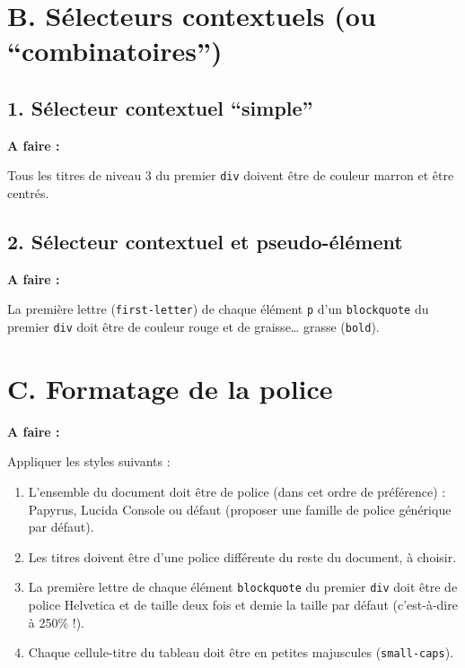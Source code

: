 \documentclass[a4paper,11pt]{article}
\begin{document}
\section{B. Sélecteurs contextuels (ou ``combinatoires'')}

\subsection{1. Sélecteur contextuel ``simple''}

\begin{afaire}
\textbf{A faire :}

Tous les titres de niveau 3 du premier \textcolor{rose}{\texttt{div}} doivent être de couleur marron et être centrés.
\end{afaire}

\subsection{2. Sélecteur contextuel et pseudo-élément}

\begin{afaire}
\textbf{A faire :}

La première lettre (\textcolor{rose}{\texttt{first-letter}}) de chaque élément \texttt{p} d'un \textcolor{rose}{\texttt{blockquote}} du premier \textcolor{rose}{\texttt{div}} doit être de couleur rouge et de graisse\ldots{} grasse (\textcolor{rose}{\texttt{bold}}).
\end{afaire}

\section{C. Formatage de la police}

\begin{afaire}
\textbf{A faire :}

Appliquer les styles suivants :
\begin{enumerate}
    \item L'ensemble du document doit être de police (dans cet ordre de préférence) : Papyrus, Lucida Console ou défaut (proposer une famille de police générique par défaut).
    \item Les titres doivent être d'une police différente du reste du document, à choisir.
    \item La première lettre de chaque élément \textcolor{rose}{\texttt{blockquote}} du premier \textcolor{rose}{\texttt{div}} doit être de police Helvetica et de taille deux fois et demie la taille par défaut (c'est-à-dire à 250\% !).
    \item Chaque cellule-titre du tableau doit être en petites majuscules (\textcolor{rose}{\texttt{small-caps}}).
\end{enumerate}
\end{afaire}
\end{document}
